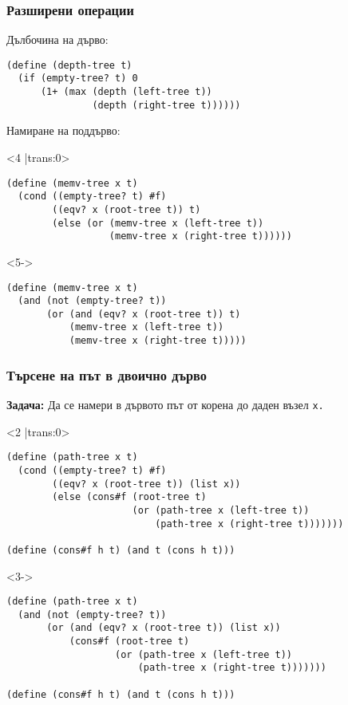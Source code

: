 \documentclass[alsotrans,beameroptions={aspectratio=169}]{beamerswitch}
\begin{document}
\begin{frame}[fragile]
  \frametitle{Разширени операции}

  Дълбочина на дърво:
  \pause
\begin{lstlisting}
(define (depth-tree t)
  (if (empty-tree? t) 0
      (1+ (max (depth (left-tree t))
               (depth (right-tree t))))))
\end{lstlisting}
  \pause
  Намиране на поддърво:
  \pause

  \begin{fixedarea}[.4]
    \begin{onlyenv}<4 |trans:0>
\begin{lstlisting}
(define (memv-tree x t)
  (cond ((empty-tree? t) #f)
        ((eqv? x (root-tree t)) t)
        (else (or (memv-tree x (left-tree t))
                  (memv-tree x (right-tree t))))))
\end{lstlisting}
    \end{onlyenv}
    \begin{onlyenv}<5->
\begin{lstlisting}
(define (memv-tree x t)
  (and (not (empty-tree? t))
       (or (and (eqv? x (root-tree t)) t)
           (memv-tree x (left-tree t))
           (memv-tree x (right-tree t)))))
\end{lstlisting}
    \end{onlyenv}
  \end{fixedarea}
\end{frame}

\begin{frame}[fragile]
  \frametitle{Търсене на път в двоично дърво}

  \textbf{Задача:} Да се намери в дървото път от корена до даден възел \tt x.
  \pause
  \begin{fixedarea}[.7]
  \begin{onlyenv}<2 |trans:0>
\begin{lstlisting}
(define (path-tree x t)
  (cond ((empty-tree? t) #f)
        ((eqv? x (root-tree t)) (list x))
        (else (cons#f (root-tree t)
                      (or (path-tree x (left-tree t))
                          (path-tree x (right-tree t)))))))

(define (cons#f h t) (and t (cons h t)))
\end{lstlisting}
  \end{onlyenv}
  \begin{onlyenv}<3->
\begin{lstlisting}
(define (path-tree x t)
  (and (not (empty-tree? t))
       (or (and (eqv? x (root-tree t)) (list x))
           (cons#f (root-tree t)
                   (or (path-tree x (left-tree t))
                       (path-tree x (right-tree t)))))))

(define (cons#f h t) (and t (cons h t)))
\end{lstlisting}
  \end{onlyenv}
\end{fixedarea}
\end{frame}
\end{document}
